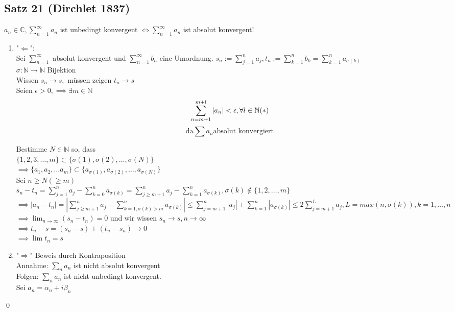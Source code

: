 \documentclass[fleqn]{scrbook}
\newcommand{\N}{\mathbb{N}}
\newcommand{\sumOI}{\sum_{n=1}^{\infty}}
\renewenvironment{proof}{{\bfseries Beweis }}{\qed}
\begin{document}
\subsection{Satz 21 (Dirchlet 1837)}
$a_n \in\mathbb{C}, \sumOI a_n$ ist unbedingt konvergent $\Leftrightarrow \sumOI a_n$ ist absolut konvergent!\\
\begin{proof}
\begin{enumerate}[1)]
  \item "$\Leftarrow$": \\
  Sei $\sumOI$ absolut konvergent und $\sumOI b_n$ eine Umordnung.
  $s_n := \sum_{j=1}^n a_j, t_n := \sum_{k=1}^n b_k = \sum_{k=1}^n a_{\sigma (k)}$\\
  $\sigma : \mathbb{N} \rightarrow \mathbb{N}$ Bijektion\\
  Wissen $s_n \rightarrow s,$ müssen zeigen $t_n \rightarrow s$\\
  Seien $\epsilon > 0, \implies \exists m \in \N$
  $$\sum_{n=m+1}^{m+l} |a_n| < \epsilon, \forall l \in\mathbb{N}\text{(\textasteriskcentered )}$$
  $$\text{da} \sum a_n \text{absolut konvergiert}$$

  Bestimme $N \in \mathbb{N}$ so, dass\\
  $\{ 1,2,3,\ldots,m\} \subset \{ \sigma (1), \sigma (2), \ldots, \sigma (N)\}$\\
  $\implies \{a_1, a_2, \ldots a_m\} \subset \{a_{\sigma (1)}, a_{\sigma(2)}, \ldots , a_{\sigma (N)}\}$\\
  Sei $n\geq N (\geq m)$\\
  $s_n - t_n = \sum_{j=1}^n a_j - \sum_{k=0}^n a_{\sigma (k)} = \sum_{j \geq m + 1}^n a_j - \sum_{k=1}^n a_{\sigma (k)}, \sigma (k) \notin \{1,2,\ldots ,m\}$\\
  $\implies |a_n - t_n| = |\sum_{j\geq m + 1}^n a_j - \sum_{k=1, \sigma(k) > m}^n a_{\sigma (k)}| \leq \sum_{j=m+1}^n |a_j| + \sum_{k=1}^n |a_{\sigma (k)}| \leq 2 \sum_{j=m+1}^L a_j, L = max(n, \sigma (k)), k=1,\ldots ,n$\\
  $\implies \lim_{n\rightarrow\infty} (s_n - t_n) = 0$ und wir wissen $s_n \rightarrow s, n \rightarrow\infty$\\
  $\implies t_n - s = (s_n - s) + (t_n - s_n) \rightarrow 0$\\
  $\implies \lim t_n = s$ \checkmark
  \item "$\Rightarrow$" Beweis durch Kontraposition\\
  Annahme: $\sum_n a_n$ ist nicht absolut konvergent\\
  Folgen: $\sum_n a_n$ ist nicht unbedingt konvergent.\\
  Sei $a_n = \alpha_n + i \beta_n$
  

\end{enumerate}
\end{proof}
\end{document}

